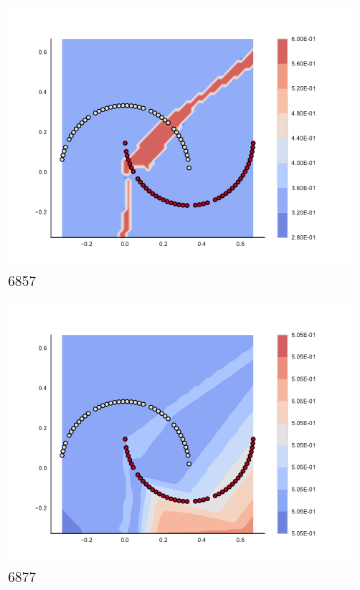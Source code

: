 \begin{figure}[h]
\begin{subfigure}[b]{0.09\textwidth}
    \includegraphics[clip, trim=2.35cm 1.75cm 4.5cm 0cm,width=\textwidth]{img/convergence/6857.pdf}
    \caption{6857}
    \label{fig:convergence_6857}
\end{subfigure}
%
\begin{subfigure}[b]{0.09\textwidth}
    \includegraphics[clip, trim=2.35cm 1.75cm 4.5cm 0cm,width=\textwidth]{img/convergence/6877.pdf}
    \caption{6877}
    \label{fig:convergence_6877}
\end{subfigure}
%
\begin{subfigure}[b]{0.09\textwidth}

\end{subfigure}
\end{figure}
